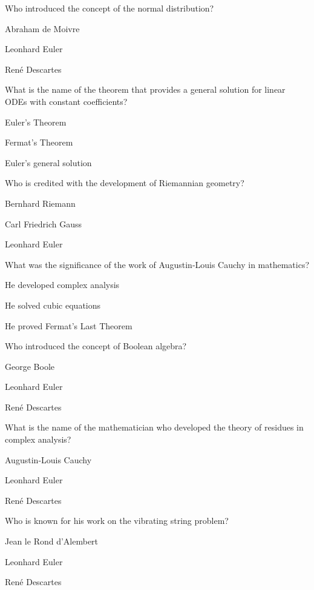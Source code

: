 \begin{enhancedmcq}{Who introduced the concept of the normal distribution?}
\item Abraham de Moivre
\item Leonhard Euler
\item René Descartes

\end{enhancedmcq}
\begin{enhancedmcq}{What is the name of the theorem that provides a general solution for linear ODEs with constant coefficients?}
\item Euler's Theorem
\item Fermat's Theorem
\item Euler's general solution

\end{enhancedmcq}
\begin{enhancedmcq}{Who is credited with the development of Riemannian geometry?}
\item Bernhard Riemann
\item Carl Friedrich Gauss
\item Leonhard Euler

\end{enhancedmcq}
\begin{enhancedmcq}{What was the significance of the work of Augustin‑Louis Cauchy in mathematics?}
\item He developed complex analysis
\item He solved cubic equations
\item He proved Fermat's Last Theorem

\end{enhancedmcq}
\begin{enhancedmcq}{Who introduced the concept of Boolean algebra?}
\item George Boole
\item Leonhard Euler
\item René Descartes

\end{enhancedmcq}
\begin{enhancedmcq}{What is the name of the mathematician who developed the theory of residues in complex analysis?}
\item Augustin‑Louis Cauchy
\item Leonhard Euler
\item René Descartes

\end{enhancedmcq}
\begin{enhancedmcq}{Who is known for his work on the vibrating string problem?}
\item Jean le Rond d'Alembert
\item Leonhard Euler
\item René Descartes

\end{enhancedmcq}
